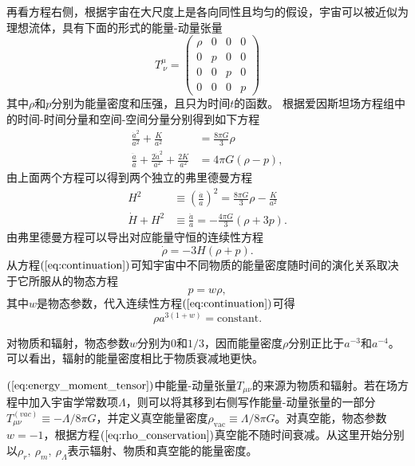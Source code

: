 再看方程右侧，根据宇宙在大尺度上是各向同性且均匀的假设，宇宙可以被近似为理想流体，具有下面的形式的能量-动量张量
\begin{equation}
    \label{eq:energy_moment_tensor}
    T^{\mu}_{\ \nu} =
    \begin{pmatrix}
        \rho & 0 & 0 & 0 \\
        0 & p & 0 & 0 \\
        0 & 0 & p & 0 \\
        0 & 0 & 0 & p
    \end{pmatrix}
\end{equation}
其中$\rho$和$p$分别为能量密度和压强，且只为时间$t$的函数。
根据爱因斯坦场方程组中的时间-时间分量和空间-空间分量分别得到如下方程
\begin{align}
    \label{eq:00_einstein} 
    \frac{\dot{a}^2}{a^2} + \frac{K}{a^2} &= \frac{8\pi G}{3} \rho \\
    \label{eq:ij_einstein}
    \frac{\ddot{a}}{a}+\frac{2\dot{a}^2}{a^2}+\frac{2K}{a^2}&= 4\pi G(\rho-p),
\end{align}
由上面两个方程可以得到两个独立的弗里德曼方程
\begin{align}
    \label{eq:1st_friedmann_equation}
    H^2 &\equiv {\left(\frac{\dot{a}}{a}\right)}^2 = \frac{8\pi G}{3} \rho -
    \frac{K}{a^2} \\
    \dot{H} + H^2 &\equiv \frac{\ddot{a}}{a} = -\frac{4\pi G}{3}\left(\rho +
    3p\right).
\end{align}
由弗里德曼方程可以导出对应能量守恒的连续性方程
\begin{equation}\label{eq:continuation}
    \dot{\rho}=-3H\left(\rho+p\right).
\end{equation}
从方程$(\ref{eq:continuation})$可知宇宙中不同物质的能量密度随时间的演化关系取决于它所服从的物态方程
\begin{equation}
    \label{eq:state_equation}
    p=w\rho,
\end{equation}
其中$w$是物态参数，代入连续性方程$(\ref{eq:continuation})$可得
\begin{equation}
    \label{eq:rho_conservation}
    \rho a^{3(1+w)} =\text{constant}.
\end{equation}

对物质和辐射，物态参数$w$分别为$0$和$1/3$，因而能量密度$\rho$分别正比于$a^{-3}$和$a^{-4}$。可以看出，辐射的能量密度相比于物质衰减地更快。

$(\ref{eq:energy_moment_tensor})$中能量-动量张量$T_{\mu\nu}$的来源为物质和辐射。若在场方程中加入宇宙学常数项$\Lambda$，则可以将其移到右侧写作能量-动量张量的一部分$T^{(vac)}_{\mu\nu}\equiv-\Lambda/{8\pi
G}$，并定义真空能量密度$\rho_{\text{vac}}\equiv\Lambda/{8\pi G}$。对真空能，物态参数$w=-1$，根据方程$(\ref{eq:rho_conservation})$真空能不随时间衰减。从这里开始分别以$\rho_r,\
\rho_m,\ \rho_{\Lambda}$表示辐射、物质和真空能的能量密度。

